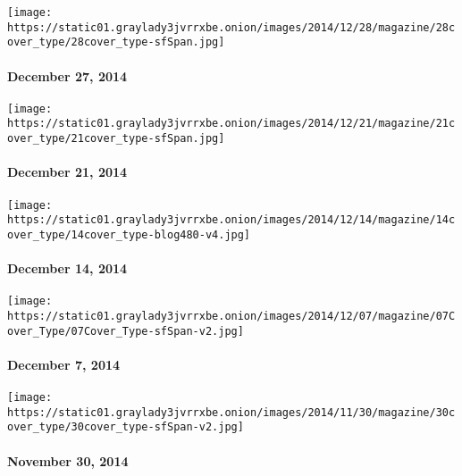 \texttt{[image: https://static01.graylady3jvrrxbe.onion/images/2014/12/28/magazine/28cover\_type/28cover\_type-sfSpan.jpg]}

\hypertarget{december-27-2014}{%
\paragraph{December 27, 2014}\label{december-27-2014}}

\href{http://www.nytimes3xbfgragh.onion/indexes/2014/12/21/magazine/index.html}{}

\texttt{[image: https://static01.graylady3jvrrxbe.onion/images/2014/12/21/magazine/21cover\_type/21cover\_type-sfSpan.jpg]}

\hypertarget{december-21-2014}{%
\paragraph{December 21, 2014}\label{december-21-2014}}

\href{http://www.nytimes3xbfgragh.onion/indexes/2014/12/14/magazine/index.html}{}

\texttt{[image: https://static01.graylady3jvrrxbe.onion/images/2014/12/14/magazine/14cover\_type/14cover\_type-blog480-v4.jpg]}

\hypertarget{december-14-2014}{%
\paragraph{December 14, 2014}\label{december-14-2014}}

\href{http://www.nytimes3xbfgragh.onion/indexes/2014/12/07/magazine/index.html}{}

\texttt{[image: https://static01.graylady3jvrrxbe.onion/images/2014/12/07/magazine/07Cover\_Type/07Cover\_Type-sfSpan-v2.jpg]}

\hypertarget{december-7-2014}{%
\paragraph{December 7, 2014}\label{december-7-2014}}

\href{http://www.nytimes3xbfgragh.onion/indexes/2014/11/30/magazine/index.html}{}

\texttt{[image: https://static01.graylady3jvrrxbe.onion/images/2014/11/30/magazine/30cover\_type/30cover\_type-sfSpan-v2.jpg]}

\hypertarget{november-30-2014}{%
\paragraph{November 30, 2014}\label{november-30-2014}}

